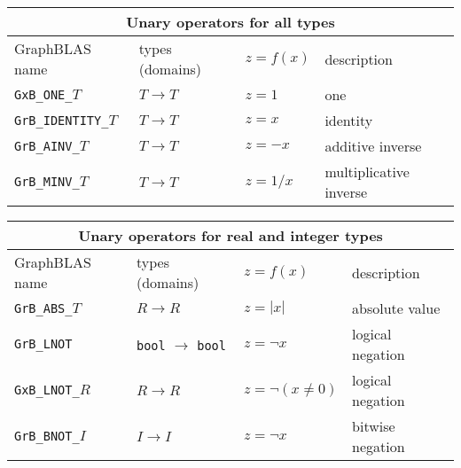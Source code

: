 \documentclass[12pt]{article}
\begin{document}
\vspace{0.2in}
{\footnotesize
\begin{tabular}{|llll|}
\hline
\multicolumn{4}{|c|}{Unary operators for all types} \\
\hline
GraphBLAS name          & types (domains)   & $z=f(x)$      & description \\
\hline
\verb'GxB_ONE_'$T$      & $T \rightarrow T$ & $z = 1$       & one \\
\verb'GrB_IDENTITY_'$T$ & $T \rightarrow T$ & $z = x$       & identity \\
\verb'GrB_AINV_'$T$     & $T \rightarrow T$ & $z = -x$      & additive inverse \\
\verb'GrB_MINV_'$T$     & $T \rightarrow T$ & $z = 1/x$     & multiplicative inverse \\
\hline
\end{tabular}
\vspace{0.2in}

\vspace{0.2in}
\begin{tabular}{|llll|}
\hline
\multicolumn{4}{|c|}{Unary operators for real and integer types} \\
\hline
GraphBLAS name          & types (domains)   & $z=f(x)$      & description \\
\hline
\verb'GrB_ABS_'$T$      & $R \rightarrow R$ & $z = |x|$     & absolute value \\
\verb'GrB_LNOT'         & \verb'bool'
                          $\rightarrow$
                          \verb'bool'       & $z = \lnot x$ & logical negation \\
\verb'GxB_LNOT_'$R$     & $R \rightarrow R$ & $z = \lnot (x \ne 0)$ & logical negation \\
\verb'GrB_BNOT_'$I$     & $I \rightarrow I$ & $z = \lnot x$ & bitwise negation \\
\hline
\end{tabular}
\vspace{0.2in}

}
\end{document}
